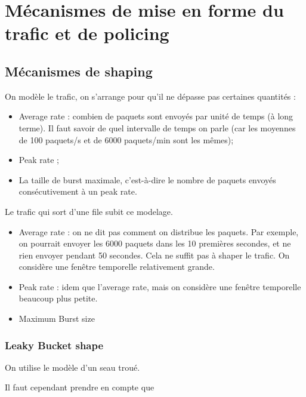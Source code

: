 \chapter{Mécanismes de mise en forme du trafic et de policing}

	\section{Mécanismes de shaping}
On modèle le trafic, on s'arrange pour qu'il ne dépasse pas certaines quantités :
		
		\begin{itemize}
			\item Average rate : combien de paquets sont envoyés par unité de temps (à long terme). Il faut savoir de quel intervalle de temps on parle (car les moyennes de 100 paquets/s et de 6000 paquets/min sont les mêmes); 
			\item Peak rate ;
			\item La taille de burst maximale, c'est-à-dire le nombre de paquets envoyés consécutivement à un peak rate.
		\end{itemize}
		
		Le trafic qui sort d'une file subit ce modelage.
		
		
		\begin{itemize}
			\item Average rate : on ne dit pas comment on distribue les paquets. Par exemple, on pourrait envoyer les 6000 paquets dans les 10 premières secondes, et ne rien envoyer pendant 50 secondes. Cela ne suffit pas à shaper le trafic. On considère une fenêtre temporelle relativement grande.
			\item Peak rate : idem que l'average rate, mais on considère une fenêtre temporelle beaucoup plus petite.

			\item Maximum Burst size
		\end{itemize}				
		
			\subsection{Leaky Bucket shape}
			
			On utilise le modèle d'un seau troué.
			
			
		
			Il faut cependant prendre en compte que
			
			
			
